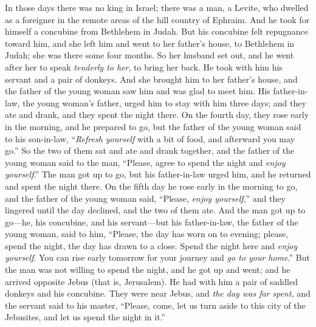 \begin{biblechapter} %
 In those days there was no king in Israel; there was a man, a Levite, who dwelled as a foreigner in the remote areas of the hill country of Ephraim. And he took for himself a concubine from Bethlehem in Judah.
\verse But his concubine felt repugnance toward him, and she left him and went to her father’s house, to Bethlehem in Judah; she was there some four months.
\verse So her husband set out, and he went after her to speak \textit{tenderly to her}, to bring her back. He took with him his servant and a pair of donkeys. And she brought him to her father’s house, and the father of the young woman saw him and was glad to meet him.
\verse His father-in-law, the young woman’s father, urged him to stay with him three days; and they ate and drank, and they spent the night there.
\verse On the fourth day, they rose early in the morning, and he prepared to go, but the father of the young woman said to his son-in-law, “\textit{Refresh yourself} with a bit of food, and afterward you may go.”
\verse So the two of them sat and ate and drank together, and the father of the young woman said to the man, “Please, agree to spend the night and \textit{enjoy yourself}.”
\verse The man got up to go, but his father-in-law urged him, and he returned and spent the night there.
\verse On the fifth day he rose early in the morning to go, and the father of the young woman said, “Please, \textit{enjoy yourself},” and they lingered until the day declined, and the two of them ate.
\verse And the man got up to go—he, his concubine, and his servant—but his father-in-law, the father of the young woman, said to him, “Please, the day has worn on to evening; please, spend the night, the day has drawn to a close. Spend the night here and \textit{enjoy yourself}. You can rise early tomorrow for your journey and \textit{go to your home}.”
\verse But the man was not willing to spend the night, and he got up and went; and he arrived opposite Jebus (that is, Jerusalem). He had with him a pair of saddled donkeys and his concubine.
\verse They were near Jebus, and \textit{the day was far spent}, and the servant said to his master, “Please, come, let us turn aside to this city of the Jebusites, and let us spend the night in it.”

\end{biblechapter}
